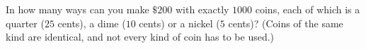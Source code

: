 In how many ways can you make $\$200$ with exactly $1000$ coins, each of which is a quarter ($25$ cents), a dime ($10$ cents) or a nickel ($5$ cents)? (Coins of the same kind are identical, and not every kind of coin has to be used.)
